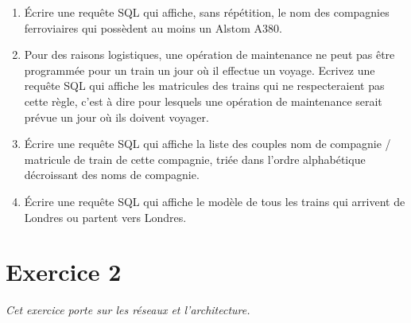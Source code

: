 \documentclass[11pt,a4paper,french,twoside]{PMCours}
\begin{document}
\begin{enumerate}
\item Écrire une requête SQL qui affiche, sans répétition, le nom des compagnies ferroviaires qui possèdent au moins un Alstom A380.
\item Pour des raisons logistiques, une opération de maintenance ne peut pas être programmée pour un train un jour où il effectue un voyage. Ecrivez une requête SQL qui affiche les matricules des trains qui ne respecteraient pas cette règle, c'est à dire pour lesquels une opération de maintenance serait prévue un jour où ils doivent voyager. 
\item Écrire une requête SQL qui affiche la liste des couples nom de compagnie / matricule de train de cette compagnie, triée dans l'ordre alphabétique décroissant des noms de compagnie.
\item Écrire une requête SQL qui affiche le modèle de tous les trains qui arrivent de Londres ou partent vers Londres.
\end{enumerate}

\newpage
\section*{Exercice 2}
\emph{Cet exercice porte sur les réseaux et l'architecture.}

\medskip
\end{document}
